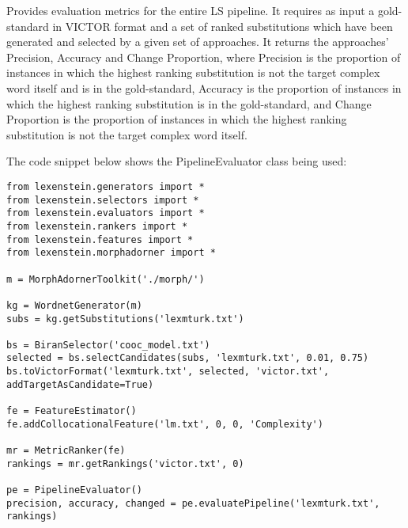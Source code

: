 Provides evaluation metrics for the entire LS pipeline. It requires as input a gold-standard in VICTOR format and a set of ranked substitutions which have been generated and selected by a given set of approaches. It returns the approaches' Precision, Accuracy and Change Proportion, where Precision is the proportion of instances in which the highest ranking substitution is not the target complex word itself and is in the gold-standard, Accuracy is the proportion of instances in which the highest ranking substitution is in the gold-standard, and Change Proportion is the proportion of instances in which the highest ranking substitution is not the target complex word itself.

The code snippet below shows the PipelineEvaluator class being used:

\begin{lstlisting}
from lexenstein.generators import *
from lexenstein.selectors import *
from lexenstein.evaluators import *
from lexenstein.rankers import *
from lexenstein.features import *
from lexenstein.morphadorner import *

m = MorphAdornerToolkit('./morph/')

kg = WordnetGenerator(m)
subs = kg.getSubstitutions('lexmturk.txt')

bs = BiranSelector('cooc_model.txt')
selected = bs.selectCandidates(subs, 'lexmturk.txt', 0.01, 0.75)
bs.toVictorFormat('lexmturk.txt', selected, 'victor.txt', addTargetAsCandidate=True)

fe = FeatureEstimator()
fe.addCollocationalFeature('lm.txt', 0, 0, 'Complexity')

mr = MetricRanker(fe)
rankings = mr.getRankings('victor.txt', 0)

pe = PipelineEvaluator()
precision, accuracy, changed = pe.evaluatePipeline('lexmturk.txt', rankings)
\end{lstlisting}